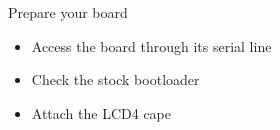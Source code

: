 {
  Prepare your board
  \begin{itemize}
  \item Access the board through its serial line
  \item Check the stock bootloader
  \item Attach the LCD4 cape
  \end{itemize}
}
